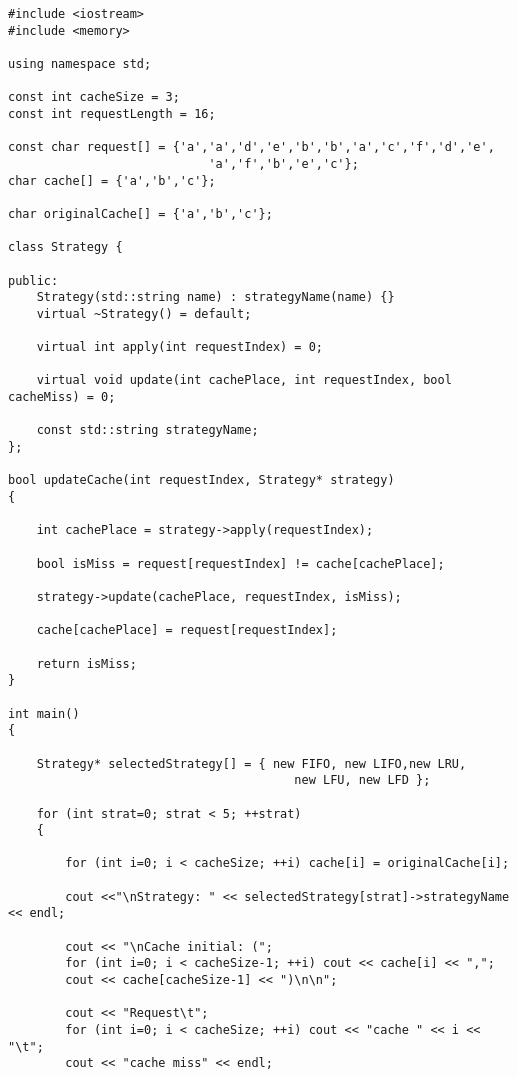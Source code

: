 \begin{tcolorbox}
\begin{verbatim}
#include <iostream>
#include <memory>

using namespace std;

const int cacheSize = 3;
const int requestLength = 16;

const char request[] = {'a','a','d','e','b','b','a','c','f','d','e',
                            'a','f','b','e','c'};
char cache[] = {'a','b','c'}; 

char originalCache[] = {'a','b','c'};

class Strategy {

public:
    Strategy(std::string name) : strategyName(name) {}
    virtual ~Strategy() = default;
    
    virtual int apply(int requestIndex) = 0;
    
    virtual void update(int cachePlace, int requestIndex, bool cacheMiss) = 0;
    
    const std::string strategyName;
};

bool updateCache(int requestIndex, Strategy* strategy)
{
    
    int cachePlace = strategy->apply(requestIndex);
    
    bool isMiss = request[requestIndex] != cache[cachePlace];
    
    strategy->update(cachePlace, requestIndex, isMiss);
    
    cache[cachePlace] = request[requestIndex];
    
    return isMiss;
}

int main()
{
    
    Strategy* selectedStrategy[] = { new FIFO, new LIFO,new LRU, 
                                        new LFU, new LFD };
    
    for (int strat=0; strat < 5; ++strat)
    {
        
        for (int i=0; i < cacheSize; ++i) cache[i] = originalCache[i];
        
        cout <<"\nStrategy: " << selectedStrategy[strat]->strategyName << endl;
        
        cout << "\nCache initial: (";
        for (int i=0; i < cacheSize-1; ++i) cout << cache[i] << ",";
        cout << cache[cacheSize-1] << ")\n\n";
        
        cout << "Request\t";
        for (int i=0; i < cacheSize; ++i) cout << "cache " << i << "\t";
        cout << "cache miss" << endl;
        

\end{verbatim}
\end{tcolorbox}
